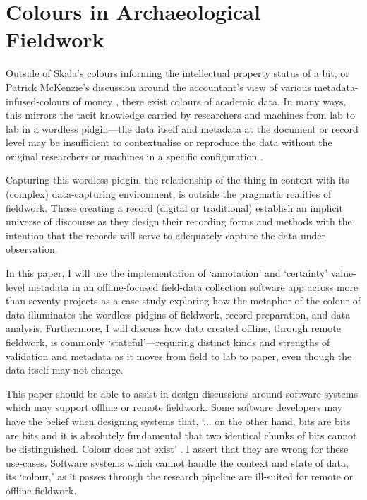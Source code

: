 \documentclass{scrarticle}
\begin{document}
\section{Colours in Archaeological Fieldwork}

Outside of Skala's colours informing the intellectual property status of a bit, or Patrick McKenzie's discussion around the accountant's view of various metadata-infused-colours of money \parencite*{Mckenzie2022-tt}, there exist colours of academic data. In many ways, this mirrors the tacit knowledge carried by researchers and machines from lab to lab in a wordless pidgin---the data itself and metadata at the document or record level may be insufficient to contextualise or reproduce the data without the original researchers or machines in a specific configuration \parencite[51]{Galison1997-dz}. 

Capturing this wordless pidgin, the relationship of the thing in context with its (complex) data-capturing environment, is outside the pragmatic realities of fieldwork. Those creating a record (digital or traditional) establish an implicit universe of discourse as they design their recording forms and methods with the intention that the records will serve to adequately capture the data under observation. 

In this paper, I will use the implementation of `annotation' and `certainty' value-level metadata in an offline-focused field-data collection software app across more than seventy projects as a case study  exploring how the metaphor of the colour of data illuminates the wordless pidgins of fieldwork, record preparation, and data analysis. Furthermore, I will discuss how data created offline, through remote fieldwork, is commonly `stateful'---requiring distinct kinds and strengths of validation and metadata as it moves from field to lab to paper, even though the data itself may not change. 

This paper should be able to assist in design discussions around software systems which may support offline or remote fieldwork. Some software developers may have the belief when designing systems that, `... on the other hand, bits are bits are bits and it is absolutely fundamental that two identical chunks of bits cannot be distinguished.  Colour does not exist' \parencite{Skala2004-zc}. I  assert that they are wrong for these use-cases. Software systems which cannot handle the context and state of data, its `colour,' as it passes through the research pipeline are ill-suited for remote or offline fieldwork.
\end{document}
